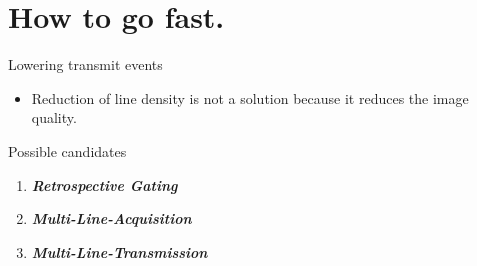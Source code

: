 \documentclass[t,12pt,english
\ifx\beamermode\undefined\else,\beamermode\fi
]{beamer}
\begin{document}
\section{How to go fast.}


\begin{frame}{Lowering transmit events}

\begin{itemize}
\color{red}
\item \tiny{Reduction of line density is not a solution because it reduces the image quality.}  
\end{itemize}



\begin{block}{\footnotesize{Possible candidates}}\tiny{}
\begin{enumerate} 
\vspace{0.05cm}
     \item \tiny{\textbf{\textit{Retrospective Gating}}}
     \item \tiny{\textbf{\textit{Multi-Line-Acquisition}}}
     \item \tiny{\textbf{\textit{Multi-Line-Transmission}}}
\end{enumerate}
\end{block}


\end{frame}
\end{document}

